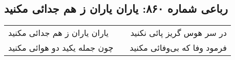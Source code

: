 \begin{center}
\section*{رباعی شماره ۸۶۰: یاران یاران ز هم جدائی مکنید}
\label{sec:0860}
\begin{longtable}{l p{0.5cm} r}
یاران یاران ز هم جدائی مکنید
&&
در سر هوس گریز پائی نکنید
\\
چون جمله یکید دو هوائی مکنید
&&
فرمود وفا که بی‌وفائی مکنید
\\
\end{longtable}
\end{center}
